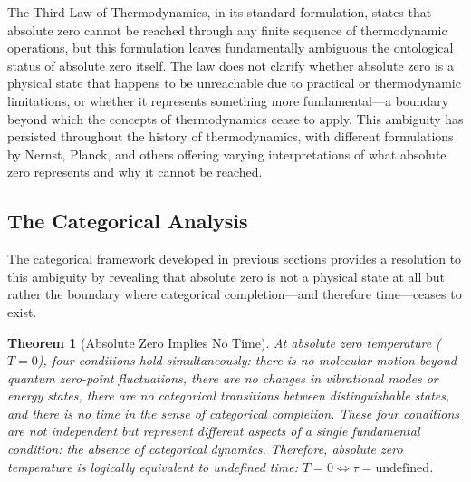 \documentclass[12pt,a4paper]{article}
\newtheorem{theorem}{Theorem}[section]
\theoremstyle{definition}
\theoremstyle{remark}
\begin{document}
The Third Law of Thermodynamics, in its standard formulation, states that absolute zero cannot be reached through any finite sequence of thermodynamic operations, but this formulation leaves fundamentally ambiguous the ontological status of absolute zero itself. The law does not clarify whether absolute zero is a physical state that happens to be unreachable due to practical or thermodynamic limitations, or whether it represents something more fundamental—a boundary beyond which the concepts of thermodynamics cease to apply. This ambiguity has persisted throughout the history of thermodynamics, with different formulations by Nernst, Planck, and others offering varying interpretations of what absolute zero represents and why it cannot be reached.

\subsection{The Categorical Analysis}

The categorical framework developed in previous sections provides a resolution to this ambiguity by revealing that absolute zero is not a physical state at all but rather the boundary where categorical completion—and therefore time—ceases to exist.

\begin{theorem}[Absolute Zero Implies No Time]
\label{thm:zero_no_time}
At absolute zero temperature ($T = 0$), four conditions hold simultaneously: there is no molecular motion beyond quantum zero-point fluctuations, there are no changes in vibrational modes or energy states, there are no categorical transitions between distinguishable states, and there is no time in the sense of categorical completion. These four conditions are not independent but represent different aspects of a single fundamental condition: the absence of categorical dynamics. Therefore, absolute zero temperature is logically equivalent to undefined time: $T = 0 \Leftrightarrow \tau = \text{undefined}$.
\end{theorem}
\end{document}
